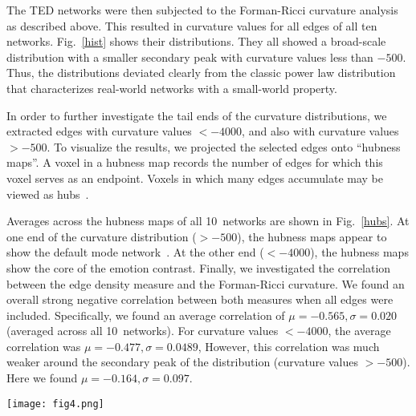 \documentclass[english,11pt]{article}
\begin{document}
The TED networks were then subjected to the Forman-Ricci curvature analysis as described above.
This resulted in curvature values for all edges of all ten networks.
Fig.~\ref{hist} shows their distributions. They all showed a broad-scale distribution with 
a smaller secondary peak with curvature values less than $-500$. Thus, the distributions deviated clearly from the
classic power law distribution that characterizes real-world networks with a small-world property.

In order to further investigate the tail ends of the curvature distributions, we extracted edges with curvature values $< -4000$,
and also with curvature values $> -500$.
To visualize the results, we projected the selected edges onto ``hubness maps''. A voxel in a hubness map
records the number of edges for which this voxel serves as an endpoint.
Voxels in which many edges accumulate may be viewed as hubs~\cite{lohmann2016}.

Averages across the hubness maps of all 10~networks are shown in Fig.~\ref{hubs}.
At one end of the curvature distribution ($> -500$), the hubness maps appear to show the default mode network~\cite{DMN}.
At the other end ($< -4000$), the  hubness maps show the core of the emotion contrast.
Finally, we investigated the correlation between the edge density measure and the Forman-Ricci curvature.
We found an overall strong negative correlation between both measures when all edges were included.
Specifically, we found an average correlation of $\mu=-0.565, \sigma=0.020$  (averaged across all 10~networks).
For curvature values $< -4000$, the average correlation was $\mu=-0.477, \sigma=0.0489$,
However, this correlation was much weaker around the secondary peak of the distribution (curvature values $> -500$).
Here we found $\mu=-0.164, \sigma=0.097$.

%
\begin{figure*}[h!]
\begin{center}
\texttt{[image: fig4.png]}
\end{center}
\caption{{\bf Average hubness maps of very low and very high curvature values.}
The top image shows an average across the 10~hubness maps using edges with curvatures $<-4000$
corresponding to the lower end of the distribution. This image approximately shows
the core the ``face-shape'' contrast of the emotion task.
The lower image shows the upper end of the distribution with curvature values $>-400$.
It appears to show the default mode network.
The images are sliced at MNI coordinates x=-3,y=-36,z=-10 (top) and x=-6,y=-53,z=21 (bottom) }
\label{hubs}
\end{figure*}
%
\end{document}
